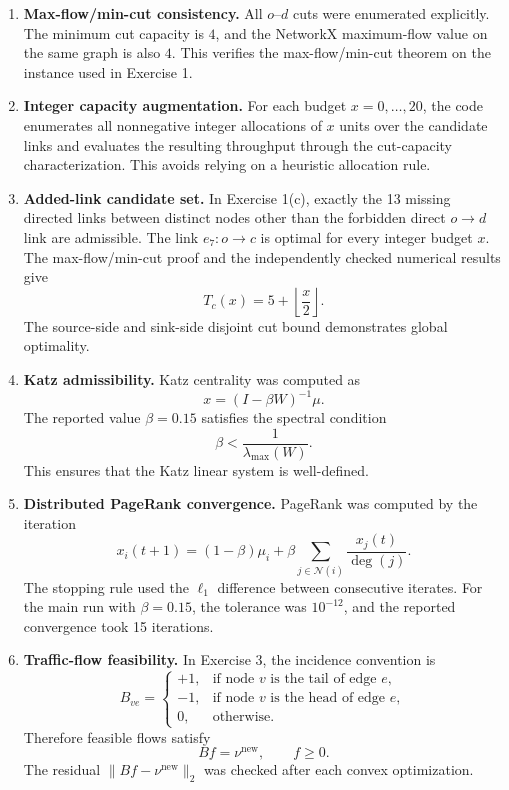 \documentclass[11pt,a4paper]{article}
\begin{document}
\begin{enumerate}
    \item \textbf{Max-flow/min-cut consistency.}
    All $o$--$d$ cuts were enumerated explicitly. The minimum cut capacity is $4$, and the
    NetworkX maximum-flow value on the same graph is also $4$. This verifies the
    max-flow/min-cut theorem on the instance used in Exercise 1.

    \item \textbf{Integer capacity augmentation.}
    For each budget $x=0,\ldots,20$, the code enumerates all nonnegative integer allocations
    of $x$ units over the candidate links and evaluates the resulting throughput through the
    cut-capacity characterization. This avoids relying on a heuristic allocation rule.

    \item \textbf{Added-link candidate set.}
    In Exercise 1(c), exactly the 13 missing directed links between distinct nodes
    other than the forbidden direct $o\to d$ link are admissible. The link
    $e_7:o\to c$ is optimal for every integer budget $x$. The max-flow/min-cut
    proof and the independently checked numerical results give
    \[
        T_c(x)=5+\left\lfloor\frac{x}{2}\right\rfloor.
    \]
    The source-side and sink-side disjoint cut bound demonstrates global optimality.

    \item \textbf{Katz admissibility.}
    Katz centrality was computed as
    \[
        x = (I-\beta W)^{-1}\mu.
    \]
    The reported value $\beta=0.15$ satisfies the spectral condition
    \[
        \beta < \frac{1}{\lambda_{\max}(W)}.
    \]
    This ensures that the Katz linear system is well-defined.

    \item \textbf{Distributed PageRank convergence.}
    PageRank was computed by the iteration
    \[
        x_i(t+1) = (1-\beta)\mu_i
        + \beta \sum_{j\in\mathcal{N}(i)}\frac{x_j(t)}{\deg(j)}.
    \]
    The stopping rule used the $\ell_1$ difference between consecutive iterates. For the
    main run with $\beta=0.15$, the tolerance was $10^{-12}$, and the reported convergence
    took 15 iterations.

    \item \textbf{Traffic-flow feasibility.}
    In Exercise 3, the incidence convention is
    \[
        B_{ve} =
        \begin{cases}
        +1, & \text{if node } v \text{ is the tail of edge } e,\\
        -1, & \text{if node } v \text{ is the head of edge } e,\\
        0, & \text{otherwise.}
        \end{cases}
    \]
    Therefore feasible flows satisfy
    \[
        Bf=\nu^{\mathrm{new}}, \qquad f\geq 0.
    \]
    The residual $\|Bf-\nu^{\mathrm{new}}\|_2$ was checked after each convex optimization.


\end{enumerate}
\end{document}
